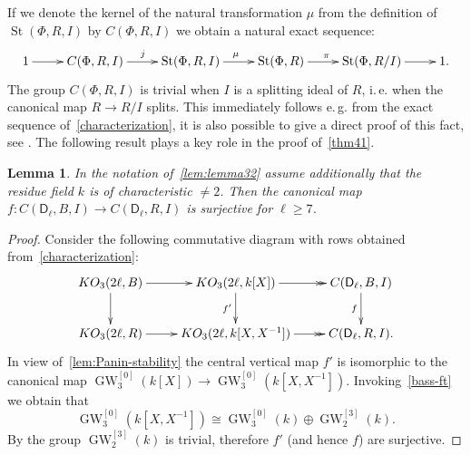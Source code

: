 \documentclass[oneside, 8pt]{amsart}
\newtheorem{lemma}{Lemma}
\theoremstyle{remark}
\theoremstyle{definition}
\DeclareMathOperator{\St}{St}
\DeclareMathOperator{\GW}{GW}
\newcommand{\rD}{\mathsf{D}}
\numberwithin{equation}{section}
\begin{document}
If we denote the kernel of the natural transformation $\mu$ from the definition of $\St(\Phi, R, I)$ by $C(\Phi, R, I)$ we obtain a natural exact sequence:
\begin{equation} \label{relSteinberg-def}
 \xymatrix{ 1 \ar[r] & C(\Phi, R, I) \ar[r]^{j} & \St(\Phi, R, I) \ar[r]^{\mu} & \St(\Phi, R) \ar[r]^{\pi} & \St(\Phi, R/I) \ar[r] & 1.}
\end{equation}
The group $C(\Phi, R, I)$ is trivial when $I$ is a splitting ideal of $R$, i.\,e. when the canonical map $R \to R/I$ splits.
This immediately follows e.\,g. from the exact sequence of~\cref{characterization}, it is also possible to give a direct proof of this fact, see \cite[Lemma~8]{S15}.
The following result plays a key role in the proof of~\cref{thm41}.
\begin{lemma} \label{lem:prop41}
In the notation of~\cref{lem:lemma32} assume additionally that the residue field $k$ is of characteristic $\neq 2$.
Then the canonical map $f\colon C(\rD_\ell, B, I) \to C(\rD_\ell, R, I)$ is surjective for $\ell \geq 7$.
\end{lemma}
\begin{proof}
  Consider the following commutative diagram with rows obtained from~\cref{characterization}:
\begin{equation*}\xymatrix{
 KO_3(2\ell, B) \ar[r] \ar[d] & KO_3(2\ell, k[X]) \ar[d]_{f'} \ar@{->>}[r] & \ar[d]_{f} C(\rD_\ell, B, I) \\
 KO_3(2\ell, R) \ar[r]        & KO_3(2\ell, k[X, X^{-1}]) \ar@{->>}[r]        & C(\rD_\ell, R, I).}\end{equation*}
In view of~\cref{lem:Panin-stability} the central vertical map $f'$ is isomorphic to the canonical map $\GW_3^{[0]}(k[X]) \to \GW_3^{[0]}(k[X, X^{-1}])$.
Invoking~\cref{bass-ft} we obtain that \[\GW_3^{[0]}(k[X, X^{-1}]) \cong \GW_3^{[0]}(k) \oplus \GW_2^{[3]}(k).\]
By \cite[Lemma~2.2]{FRS12} the group $\GW_2^{[3]}(k)$ is trivial, therefore $f'$ (and hence $f$) are surjective.
\end{proof}
\end{document}
